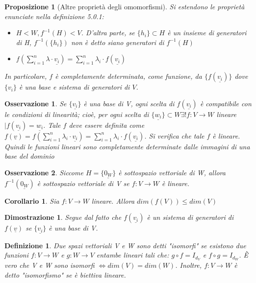 \documentclass[12pt]{article}
\newenvironment{para}{\begin{adjustwidth}{13mm}{}}{\end{adjustwidth}}
\newtheorem{Definizione}{Definizione}[subsection]
\newtheorem{Corollario}{Corollario}[subsection]
\newtheorem{Proposizione}{Proposizione}[subsection]
\newtheorem{Dimostrazione}{Dimostrazione}[subsection]
\newtheorem{Osservazione}{Osservazione}[subsection]
\begin{document}
\begin{para}
\begin{Proposizione}[Altre proprietà degli omomorfismi]
Si estendono le proprietà enunciate nella definizione 5.0.1:
\begin{itemize}
    \item $H<W, f^{-1}(H) < V$. D'altra parte, se $\{h_i\}\subset H$ è un insieme di generatori di H, $f^{-1}(\{h_i\})$ non è detto siano generatori di $f^{-1}(H)$
    \item $f(\sum_{i=1}^n \lambda \cdot \underline{v_i}) = \sum_{i=1}^n\lambda_i \cdot f(\underline{v_i})$
\end{itemize}
In particolare, $f$ è completamente determinata, come funzione, da $\{f(\underline{v_i})\}$ dove $\{v_i\}$ è una base e sistema di generatori di $V$.
\end{Proposizione}
\begin{Osservazione}
    Se $\{\underline{v_i}\}$ è una base di V, ogni scelta di $f(\underline{v_i})$ è compatibile con le condizioni di linearità; cioè, per ogni scelta di $\{\underline{w_i}\}\subset W \exists ! f:V \rightarrow W$ lineare $| f(\underline{v_i})=\underline{w_i}$. Tale $f$ deve essere definita come $f(\underline{v}) = f(\sum_{i=1}^n \lambda_i \cdot \underline{v_i}) = \sum_{i=1}^n \lambda_i \cdot f(\underline{v_i})$. Si verifica che tale $f$ è lineare. Quindi le funzioni lineari sono completamente determinate dalle immagini di una base del dominio
\end{Osservazione}
\begin{Osservazione}
    Siccome $H = \{\underline{0_W}\}$ è sottospazio vettoriale di W, allora $f^{-1}(\underline{0_W})$ è sottospazio vettoriale di V se $f:V \rightarrow W$ è lineare.
\end{Osservazione}
\begin{Corollario}
    Sia $f:V\rightarrow W$ lineare. Allora $dim(f(V)) \le dim(V)$
\end{Corollario}
\begin{Dimostrazione}
    Segue dal fatto che $f(\underline{v_i})$ è un sistema di generatori di $f(\underline{v})$ se $\{\underline{v_i}\}$ è una base di V.
\end{Dimostrazione}
\begin{Definizione}
    Due spazi vettoriali V e W sono detti "isomorfi" se esistono due funzioni $f:V \rightarrow W$ e $g:W \rightarrow V$ entambe lineari tali che: $g \circ f = I_{d_{V}}$ e $f \circ g = I_{d_W}$. È vero che V e W sono isomorfi $\Leftrightarrow dim(V) = dim(W)$. Inoltre, $f:V \rightarrow W$ è detto "isomorfismo" se è biettiva lineare.
\end{Definizione}

\end{para}
\end{document}
